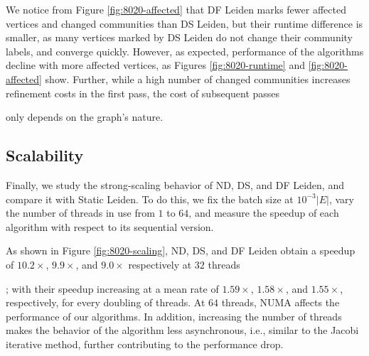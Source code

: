 We notice from Figure \ref{fig:8020-affected} that DF Leiden marks fewer affected vertices and changed communities than DS Leiden, but their runtime difference is smaller, as many vertices marked by DS Leiden do not change their community labels, and converge quickly. However, as expected, performance of the algorithms decline with more affected vertices, as Figures \ref{fig:8020-runtime} and \ref{fig:8020-affected} show. Further, while a high number of changed communities increases refinement costs in the first pass, the cost of subsequent passes only depends on the graph's nature.






\subsection{Scalability}

Finally, we study the strong-scaling behavior of ND, DS, and DF Leiden, and compare it with Static Leiden. To do this, we fix the batch size at $10^{-3} |E|$, vary the number of threads in use from $1$ to $64$, and measure the speedup of each algorithm with respect to its sequential version.

As shown in Figure \ref{fig:8020-scaling}, ND, DS, and DF Leiden obtain a speedup of $10.2\times$, $9.9\times$, and $9.0\times$ respectively at $32$ threads; with their speedup increasing at a mean rate of $1.59\times$, $1.58\times$, and $1.55\times$, respectively, for every doubling of threads. At $64$ threads, NUMA affects the performance of our algorithms. In addition, increasing the number of threads makes the behavior of the algorithm less asynchronous, i.e., similar to the Jacobi iterative method, further contributing to the performance drop.

